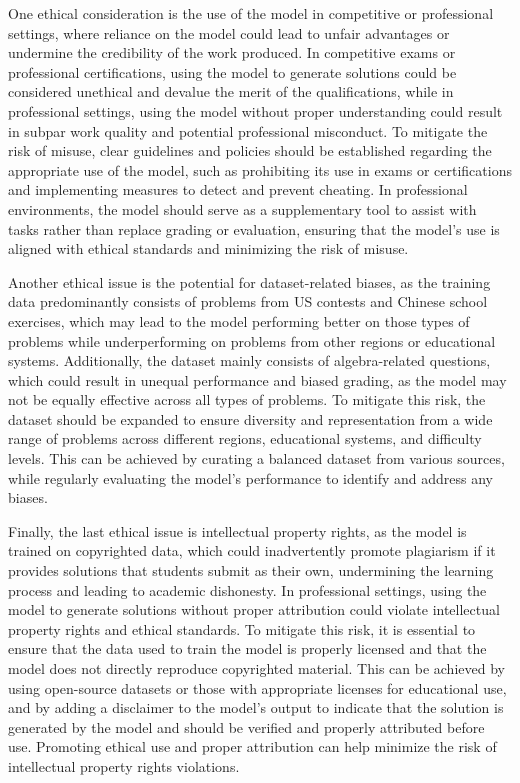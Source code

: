 \documentclass{article}
\begin{document}


One ethical consideration is the use of the model in competitive or professional settings, where reliance on the model could lead to unfair advantages or undermine the credibility of the work produced. In competitive exams or professional certifications, using the model to generate solutions could be considered unethical and devalue the merit of the qualifications, while in professional settings, using the model without proper understanding could result in subpar work quality and potential professional misconduct. To mitigate the risk of misuse, clear guidelines and policies should be established regarding the appropriate use of the model, such as prohibiting its use in exams or certifications and implementing measures to detect and prevent cheating. In professional environments, the model should serve as a supplementary tool to assist with tasks rather than replace grading or evaluation, ensuring that the model's use is aligned with ethical standards and minimizing the risk of misuse.

Another ethical issue is the potential for dataset-related biases, as the training data predominantly consists of problems from US contests and Chinese school exercises, which may lead to the model performing better on those types of problems while underperforming on problems from other regions or educational systems. Additionally, the dataset mainly consists of algebra-related questions, which could result in unequal performance and biased grading, as the model may not be equally effective across all types of problems. To mitigate this risk, the dataset should be expanded to ensure diversity and representation from a wide range of problems across different regions, educational systems, and difficulty levels. This can be achieved by curating a balanced dataset from various sources, while regularly evaluating the model's performance to identify and address any biases.

Finally, the last ethical issue is intellectual property rights, as the model is trained on copyrighted data, which could inadvertently promote plagiarism if it provides solutions that students submit as their own, undermining the learning process and leading to academic dishonesty. In professional settings, using the model to generate solutions without proper attribution could violate intellectual property rights and ethical standards. To mitigate this risk, it is essential to ensure that the data used to train the model is properly licensed and that the model does not directly reproduce copyrighted material. This can be achieved by using open-source datasets or those with appropriate licenses for educational use, and by adding a disclaimer to the model's output to indicate that the solution is generated by the model and should be verified and properly attributed before use. Promoting ethical use and proper attribution can help minimize the risk of intellectual property rights violations.
\end{document}
